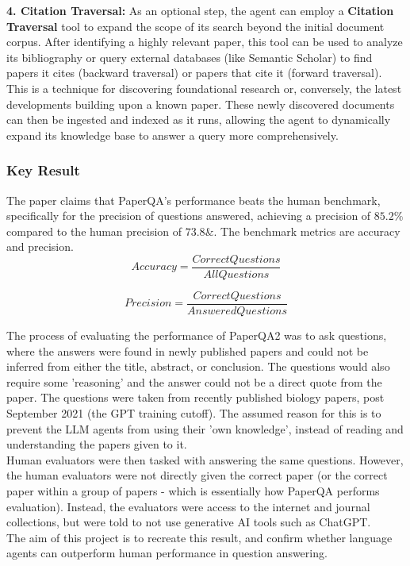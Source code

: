 \textbf{4. Citation Traversal:}
As an optional step, the agent can employ a \textbf{Citation Traversal} tool to expand the scope of its search beyond the initial document corpus. After identifying a highly relevant paper, this tool can be used to analyze its bibliography or query external databases (like Semantic Scholar) to find papers it cites (backward traversal) or papers that cite it (forward traversal). This is a technique for discovering foundational research or, conversely, the latest developments building upon a known paper. These newly discovered documents can then be ingested and indexed as it runs, allowing the agent to dynamically expand its knowledge base to answer a query more comprehensively. \\

\subsubsection{Key Result}
The paper claims that PaperQA's performance beats the human benchmark, specifically for the precision of questions answered, achieving a precision of $85.2\%$ compared to the human precision of $73.8\&$. The benchmark metrics are accuracy and precision. \\

\begin{equation}
    Accuracy = \frac{Correct Questions}{All Questions}
\end{equation}


\begin{equation}
    Precision = \frac{Correct Questions}{Answered Questions}
\end{equation}

The process of evaluating the performance of PaperQA2 was to ask questions, where the answers were found in newly published papers and could not be inferred from either the title, abstract, or conclusion.
The questions would also require some 'reasoning' and the answer could not be a direct quote from the paper.  
The questions were taken from recently published biology papers, post September 2021 (the GPT training cutoff). The assumed reason for this is to prevent the LLM agents from using their 'own knowledge', instead of reading and understanding the papers given to it. \\

Human evaluators were then tasked with answering the same questions. 
However, the human evaluators were not directly given the correct paper (or the correct paper within a group of papers - which is essentially how PaperQA performs evaluation). 
Instead, the evaluators were access to the internet and journal collections, but were told to not use generative AI tools such as ChatGPT.\\

The aim of this project is to recreate this result, and confirm whether language agents can outperform human performance in question answering. \\

